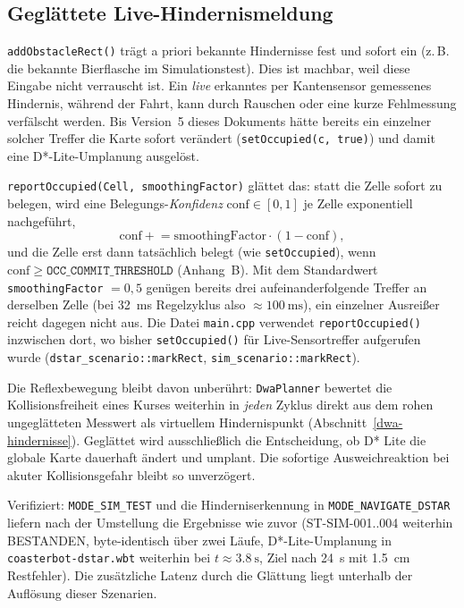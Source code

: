 \documentclass[
  a4paper,
  12pt,
  DIV=12,        %
  parskip=half,  %
  headings=small %
]{scrartcl}
\theoremstyle{definition}
\theoremstyle{definition}
\begin{document}
\subsection{Geglättete Live-Hindernismeldung}\label{grid-glaettung}

\texttt{addObstacleRect()} trägt a priori bekannte Hindernisse fest und
sofort ein (z.\,B. die bekannte Bierflasche im Simulationstest). Dies ist
machbar, weil diese Eingabe nicht verrauscht ist. Ein \emph{live} erkanntes per
Kantensensor gemessenes Hindernis, während der Fahrt,
kann durch Rauschen oder eine kurze Fehlmessung verfälscht werden. Bis Version~5 dieses
Dokuments hätte bereits ein einzelner solcher Treffer die Karte sofort
verändert (\texttt{setOccupied(c, true)}) und damit eine D*-Lite-Umplanung
ausgelöst.

\texttt{reportOccupied(Cell, smoothingFactor)} glättet das: statt die
Zelle sofort zu belegen, wird eine Belegungs-\emph{Konfidenz}
$\mathrm{conf} \in [0,1]$ je Zelle exponentiell nachgeführt,
\[
\mathrm{conf} \mathrel{+}= \text{smoothingFactor} \cdot (1 - \mathrm{conf}),
\]
und die Zelle erst dann tatsächlich belegt (wie \texttt{setOccupied}),
wenn $\mathrm{conf} \ge \texttt{OCC\_COMMIT\_THRESHOLD}$ (Anhang~B). Mit
dem Standardwert \texttt{smoothingFactor} $= 0{,}5$ genügen bereits drei
aufeinanderfolgende Treffer an derselben Zelle (bei \SI{32}{\milli\second}
Regelzyklus also $\approx \SI{100}{\milli\second}$), ein einzelner
Ausreißer reicht dagegen nicht aus. Die Datei  \texttt{main.cpp} verwendet
\texttt{reportOccupied()} inzwischen dort, wo bisher
\texttt{setOccupied()} für Live-Sensortreffer aufgerufen wurde
(\texttt{dstar\_scenario::markRect}, \texttt{sim\_scenario::markRect}).

Die Reflexbewegung bleibt davon unberührt: \texttt{DwaPlanner}
bewertet die Kollisionsfreiheit eines Kurses weiterhin in \emph{jeden}
Zyklus direkt aus dem rohen ungeglätteten Messwert als virtuellem
Hindernispunkt (Abschnitt~\ref{dwa-hindernisse}). Geglättet wird
ausschließlich die Entscheidung, ob D* Lite die
globale Karte dauerhaft ändert und umplant. Die sofortige Ausweich\-reaktion
bei akuter Kollisionsgefahr bleibt so unverzögert.

Verifiziert: \texttt{MODE\_SIM\_TEST} und die Hinderniserkennung in
\texttt{MODE\_NAVIGATE\_DSTAR} liefern nach der Umstellung die
Ergebnisse wie zuvor (ST-SIM-001..004 weiterhin BESTANDEN,
byte-identisch über zwei Läufe, D*-Lite-Umplanung in
\texttt{coasterbot-dstar.wbt} weiterhin bei $t \approx \SI{3.8}{\second}$,
Ziel nach \SI{24}{\second} mit \SI{1.5}{\centi\meter} Restfehler). Die
zusätzliche Latenz durch die Glättung liegt unterhalb der Auflösung dieser
Szenarien.
\end{document}
